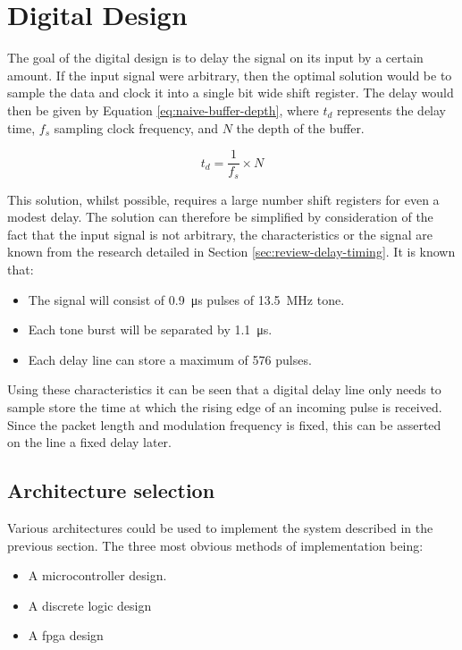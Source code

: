 \section{Digital Design} \label{sec:delay-line-dig-des}

The goal of the digital design is to delay the signal on its input by a certain amount. If the input signal were arbitrary, then the optimal solution would be to sample the data and clock it into a single bit wide shift register. The delay would then be given by Equation \ref{eq:naive-buffer-depth}, where $t_d$ represents the delay time, $f_s$ sampling clock frequency, and $N$ the depth of the buffer.

\begin{equation}
	t_d = \frac{1}{f_s} \times N \label{eq:naive-buffer-depth}
\end{equation}

This solution, whilst possible, requires a large number shift registers for even a modest delay. The solution can therefore be simplified by consideration of the fact that the input signal is not arbitrary, the characteristics or the signal are known from the research detailed in Section \ref{sec:review-delay-timing}. It is known that:
\begin{itemize}
	\item The signal will consist of \SI{0.9}{\micro\second} pulses of \SI{13.5}{\mega\hertz} tone.
	\item Each tone burst will be separated by \SI{1.1}{\micro\second}.
	\item Each delay line can store a maximum of 576 pulses.
\end{itemize}

Using these characteristics it can be seen that a digital delay line only needs to sample store the time at which the rising edge of an incoming pulse is received. Since the packet length and modulation frequency is fixed, this can be asserted on the line a fixed delay later.

\subsection{Architecture selection}

Various architectures could be used to implement the system described in the previous section. The three most obvious methods of implementation being:
\begin{itemize}
	\item A microcontroller design.
	\item A discrete logic design
	\item A \gls{fpga} design
\end{itemize}

